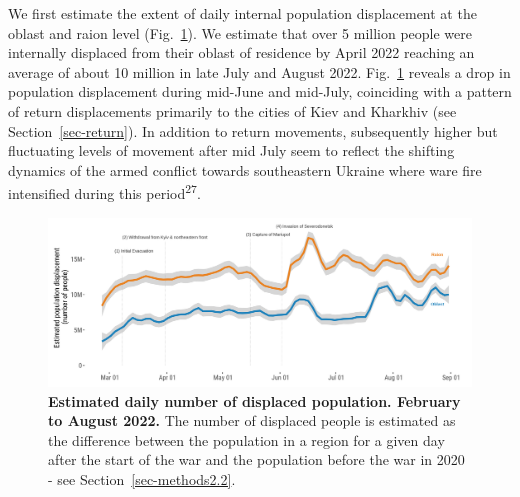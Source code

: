 \documentclass[
  11pt,
]{article}
\begin{document}
We first estimate the extent of daily internal population displacement
at the oblast and raion level (Fig.~\ref{fig-popdisplacement}). We
estimate that over 5 million people were internally displaced from their
oblast of residence by April 2022 reaching an average of about 10
million in late July and August 2022. Fig.~\ref{fig-popdisplacement}
reveals a drop in population displacement during mid-June and mid-July,
coinciding with a pattern of return displacements primarily to the
cities of Kiev and Kharkhiv (see Section~\ref{sec-return}). In addition
to return movements, subsequently higher but fluctuating levels of
movement after mid July seem to reflect the shifting dynamics of the
armed conflict towards southeastern Ukraine where ware fire intensified
during this period\textsuperscript{27}.

\begin{figure}[h]

\begin{minipage}{\linewidth}

\includegraphics{../outputs/2_1/fig1.jpg}

\end{minipage}%

\caption{\label{fig-popdisplacement}\textbf{Estimated daily number of
displaced population. February to August 2022.} The number of displaced
people is estimated as the difference between the population in a region
for a given day after the start of the war and the population before the
war in 2020 - see Section~\ref{sec-methods2.2}.}

\end{figure}%
\end{document}
